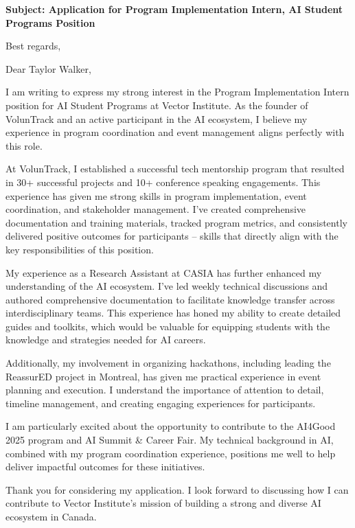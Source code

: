 \documentclass[11pt,a4paper,roman]{moderncv}
\begin{document}
\date{\today}
\opening{\textbf{Subject: Application for Program Implementation Intern, AI Student Programs Position}}
\closing{Best regards,}

\makelettertitle

Dear Taylor Walker,

I am writing to express my strong interest in the Program Implementation Intern position for AI Student Programs at Vector Institute. As the founder of VolunTrack and an active participant in the AI ecosystem, I believe my experience in program coordination and event management aligns perfectly with this role.

At VolunTrack, I established a successful tech mentorship program that resulted in 30+ successful projects and 10+ conference speaking engagements. This experience has given me strong skills in program implementation, event coordination, and stakeholder management. I've created comprehensive documentation and training materials, tracked program metrics, and consistently delivered positive outcomes for participants – skills that directly align with the key responsibilities of this position.

My experience as a Research Assistant at CASIA has further enhanced my understanding of the AI ecosystem. I've led weekly technical discussions and authored comprehensive documentation to facilitate knowledge transfer across interdisciplinary teams. This experience has honed my ability to create detailed guides and toolkits, which would be valuable for equipping students with the knowledge and strategies needed for AI careers.

Additionally, my involvement in organizing hackathons, including leading the ReassurED project in Montreal, has given me practical experience in event planning and execution. I understand the importance of attention to detail, timeline management, and creating engaging experiences for participants.

I am particularly excited about the opportunity to contribute to the AI4Good 2025 program and AI Summit & Career Fair. My technical background in AI, combined with my program coordination experience, positions me well to help deliver impactful outcomes for these initiatives.

Thank you for considering my application. I look forward to discussing how I can contribute to Vector Institute's mission of building a strong and diverse AI ecosystem in Canada.

\makeletterclosing
\end{document}
